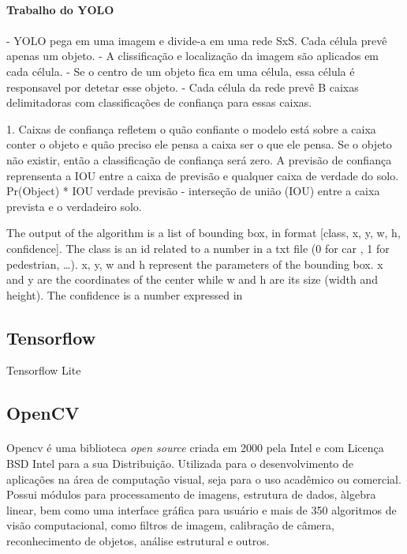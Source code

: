 \paragraph{Trabalho do YOLO}
\paragraph{}

- YOLO pega em uma imagem e divide-a em uma rede SxS. Cada célula prevê apenas um objeto.
- A clissificação e localização da imagem são aplicados em cada célula.
- Se o centro de um objeto fica em uma célula, essa célula é responsavel por detetar esse objeto.
- Cada célula da rede prevê B caixas delimitadoras com classificações de confiança para essas caixas.

1. Caixas de confiança refletem o quão confiante o modelo está sobre a caixa conter o objeto e quão preciso ele pensa a caixa ser o que ele pensa. Se o objeto não existir, então a classificação de confiança será zero. 
\newline
A previsão de confiança reprensenta a IOU entre a caixa de previsão e qualquer caixa de verdade do solo.
Pr(Object) * IOU verdade previsão - interseção de união (IOU) entre a caixa prevista e o verdadeiro solo.


The output of the algorithm is a list of bounding box, in format [class, x, y, w, h, confidence]. The class is an id related to a number in a txt file (0 for car , 1 for pedestrian, …). x, y, w and h represent the parameters of the bounding box. x and y are the coordinates of the center while w and h are its size (width and height). The confidence is a number expressed in %

\subsection{Tensorflow}
\label{chap2:subsec:tensorflow}

Tensorflow Lite


\subsection{OpenCV}
\label{chap2:subsec:opencv}
\paragraph{}

Opencv é uma biblioteca \textit{open source} criada em 2000 pela Intel e com Licença BSD Intel para a sua Distribuição. Utilizada para o desenvolvimento de aplicações na área de computação visual, seja para o uso acadêmico ou comercial. Possui módulos para processamento de imagens, estrutura de dados, àlgebra linear, bem como uma interface gráfica para usuário e mais de 350 algoritmos de visão computacional, como filtros de imagem, calibração de câmera, reconhecimento de objetos, análise estrutural e outros.



